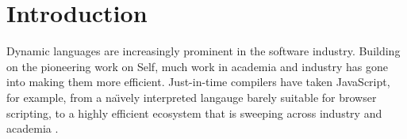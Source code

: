 
\section{Introduction}
\label{sec:introduction}

%
%

Dynamic languages are increasingly prominent in the software industry.
Building on the pioneering work on Self\citep{Self}, 
much work in academia and industry
has gone into making them more efficient\citep{Bolz2013,Bolz:2013:IMT,Wurthinger:2017:PPE,Daloze2016,Clifford:2015:MM,Degenbaev:2016:ITG}.
Just-in-time compilers have taken JavaScript, for example, from a
na{\"\i}vely interpreted langauge barely suitable for browser scripting, 
to a highly efficient ecosystem that is sweeping  across industry
and academia \cite{githut2018}.


